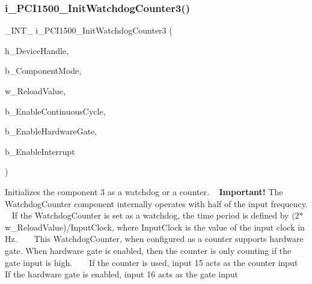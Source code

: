 \subsubsection{\texorpdfstring{i\_PCI1500\_InitWatchdogCounter3()}{i\_PCI1500\_InitWatchdogCounter3()}}
{\footnotesize\ttfamily \+\_\+\+I\+N\+T\+\_\+ i\+\_\+\+P\+C\+I1500\+\_\+\+Init\+Watchdog\+Counter3 (\begin{DoxyParamCaption}\item[{H\+A\+N\+D\+LE}]{h\+\_\+\+Device\+Handle,  }\item[{B\+Y\+TE}]{b\+\_\+\+Component\+Mode,  }\item[{W\+O\+RD}]{w\+\_\+\+Reload\+Value,  }\item[{B\+Y\+TE}]{b\+\_\+\+Enable\+Continuous\+Cycle,  }\item[{B\+Y\+TE}]{b\+\_\+\+Enable\+Hardware\+Gate,  }\item[{B\+Y\+TE}]{b\+\_\+\+Enable\+Interrupt }\end{DoxyParamCaption})}

Initializes the component 3 as a watchdog or a counter. ~\newline
 {\bfseries{Important!}} The Watchdog\+Counter component internally operates with half of the input frequency. ~\newline
 If the Watchdog\+Counter is set as a watchdog, the time period is defined by (2$\ast$w\+\_\+\+Reload\+Value)/\+Input\+Clock, where Input\+Clock is the value of the input clock in Hz. ~\newline
 ~\newline
 This Watchdog\+Counter, when configured as a counter supports hardware gate. When hardware gate is enabled, then the counter is only counting if the gate input is high. ~\newline
 ~\newline
 If the counter is used, input 15 acts as the counter input ~\newline
 If the hardware gate is enabled, input 16 acts as the gate input ~\newline
 
